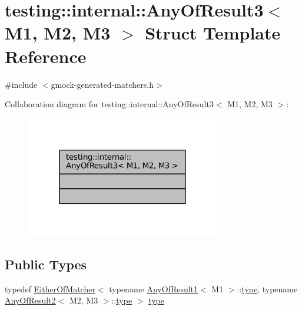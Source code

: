 \hypertarget{structtesting_1_1internal_1_1AnyOfResult3}{}\section{testing\+:\+:internal\+:\+:Any\+Of\+Result3$<$ M1, M2, M3 $>$ Struct Template Reference}
\label{structtesting_1_1internal_1_1AnyOfResult3}


{\ttfamily \#include $<$gmock-\/generated-\/matchers.\+h$>$}



Collaboration diagram for testing\+:\+:internal\+:\+:Any\+Of\+Result3$<$ M1, M2, M3 $>$\+:
\nopagebreak
\begin{figure}[H]
\begin{center}
\leavevmode
\includegraphics[width=240pt]{structtesting_1_1internal_1_1AnyOfResult3__coll__graph}
\end{center}
\end{figure}
\subsection*{Public Types}
\begin{DoxyCompactItemize}
\item 
typedef \hyperlink{classtesting_1_1internal_1_1EitherOfMatcher}{Either\+Of\+Matcher}$<$ typename \hyperlink{structtesting_1_1internal_1_1AnyOfResult1}{Any\+Of\+Result1}$<$ M1 $>$\+::\hyperlink{structtesting_1_1internal_1_1AnyOfResult3_a232b20553cc0a33a6741e85e19ef4b0c}{type}, typename \hyperlink{structtesting_1_1internal_1_1AnyOfResult2}{Any\+Of\+Result2}$<$ M2, M3 $>$\+::\hyperlink{structtesting_1_1internal_1_1AnyOfResult3_a232b20553cc0a33a6741e85e19ef4b0c}{type} $>$ \hyperlink{structtesting_1_1internal_1_1AnyOfResult3_a232b20553cc0a33a6741e85e19ef4b0c}{type}
\end{DoxyCompactItemize}


